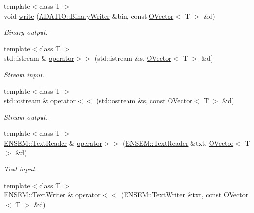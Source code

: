 \begin{DoxyCompactItemize}
{\footnotesize template$<$class T $>$ }\\void \mbox{\hyperlink{group__obsvector_gab76c1efedcd0fb2cbe27c2c995c6d110}{write}} (\mbox{\hyperlink{classADATIO_1_1BinaryWriter}{A\+D\+A\+T\+I\+O\+::\+Binary\+Writer}} \&bin, const \mbox{\hyperlink{classENSEM_1_1OVector}{O\+Vector}}$<$ T $>$ \&d)
\begin{DoxyCompactList}\small\item\em Binary output. \end{DoxyCompactList}\item 
{\footnotesize template$<$class T $>$ }\\std\+::istream \& \mbox{\hyperlink{group__obsvector_ga1777cce8b68792ed5e825b20f286394e}{operator$>$$>$}} (std\+::istream \&s, \mbox{\hyperlink{classENSEM_1_1OVector}{O\+Vector}}$<$ T $>$ \&d)
\begin{DoxyCompactList}\small\item\em Stream input. \end{DoxyCompactList}\item 
{\footnotesize template$<$class T $>$ }\\std\+::ostream \& \mbox{\hyperlink{group__obsvector_ga9f3b52a0bbdae09acbfdfc9471404f5d}{operator$<$$<$}} (std\+::ostream \&s, const \mbox{\hyperlink{classENSEM_1_1OVector}{O\+Vector}}$<$ T $>$ \&d)
\begin{DoxyCompactList}\small\item\em Stream output. \end{DoxyCompactList}\item 
{\footnotesize template$<$class T $>$ }\\\mbox{\hyperlink{classENSEM_1_1TextReader}{E\+N\+S\+E\+M\+::\+Text\+Reader}} \& \mbox{\hyperlink{group__obsvector_gacb0aa516bb0d8f52c729250ac9faff3f}{operator$>$$>$}} (\mbox{\hyperlink{classENSEM_1_1TextReader}{E\+N\+S\+E\+M\+::\+Text\+Reader}} \&txt, \mbox{\hyperlink{classENSEM_1_1OVector}{O\+Vector}}$<$ T $>$ \&d)
\begin{DoxyCompactList}\small\item\em Text input. \end{DoxyCompactList}\item 
{\footnotesize template$<$class T $>$ }\\\mbox{\hyperlink{classENSEM_1_1TextWriter}{E\+N\+S\+E\+M\+::\+Text\+Writer}} \& \mbox{\hyperlink{group__obsvector_gab5665d6ff814904bdb812d03f102731a}{operator$<$$<$}} (\mbox{\hyperlink{classENSEM_1_1TextWriter}{E\+N\+S\+E\+M\+::\+Text\+Writer}} \&txt, const \mbox{\hyperlink{classENSEM_1_1OVector}{O\+Vector}}$<$ T $>$ \&d)

\end{DoxyCompactItemize}
